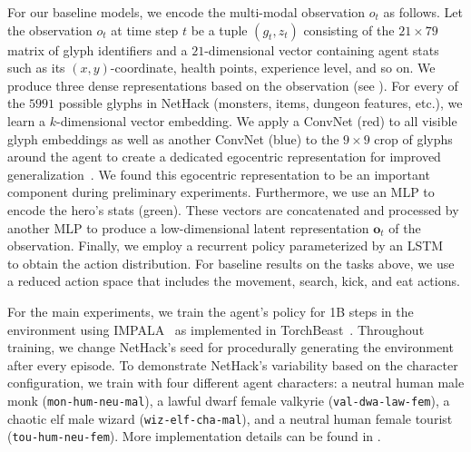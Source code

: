 \documentclass{article}
\newcommand{\nethack}{NetHack}
\begin{document}
For our baseline models, we encode the multi-modal observation $o_t$ as
follows.  Let the observation $o_t$ at time step $t$ be a tuple $(g_t,
z_t)$ consisting of the $21\times 79$ matrix of glyph identifiers and a
$21$-dimensional vector containing agent stats such as its
$(x,y)$-coordinate, health points, experience level, and so on.  We
produce three dense representations based on the observation (see
).  For every of the $5991$ possible glyphs in
\nethack{} (monsters, items, dungeon features, etc.), we learn a
$k$-dimensional vector embedding.  We apply a
ConvNet (red) to all visible glyph embeddings as well as
another ConvNet (blue) to
the $9\times 9$ crop of glyphs around the agent to create a dedicated egocentric representation for improved
generalization~\citep{DBLP:journals/corr/abs-1910-00571,ye2020rotation}.
We found this egocentric representation to be an important component during preliminary experiments.
Furthermore, we use an MLP to encode the hero's stats (green).  These
vectors are concatenated and processed by another MLP to produce
a low-dimensional latent representation $\mathbf{o}_t$ of the
observation.  Finally, we employ a recurrent policy parameterized
by an LSTM~\citep{DBLP:journals/neco/HochreiterS97} to obtain the
action distribution.
For baseline results on the tasks above, we use a reduced action space that includes the movement, search, kick, and eat actions.

For the main experiments, we train the agent's policy for 1B steps in the environment using
IMPALA~\citep{DBLP:conf/icml/EspeholtSMSMWDF18} as implemented in
TorchBeast~\citep{Kttler2019TorchBeastAP}.  Throughout training, we
change \nethack{}'s seed for procedurally generating the environment
after every episode.
To demonstrate NetHack's variability based on the character configuration, we train with four different agent characters: a neutral human male monk (\verb~mon-hum-neu-mal~), a lawful dwarf female valkyrie (\verb~val-dwa-law-fem~), a chaotic elf male wizard (\verb~wiz-elf-cha-mal~), and a neutral human female tourist (\verb~tou-hum-neu-fem~).
More implementation details
can be found in .
\end{document}
